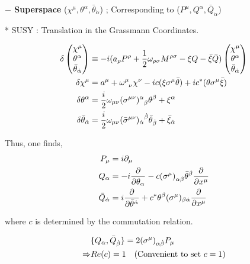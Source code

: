 \documentclass[11pt,letterpaper]{article}
\begin{document}
{\bfseries $-$ Superspace} ($\chi^\mu, \theta^\alpha, \bar{\theta}_\Dot{\alpha} $) ; Corresponding to ($P^\mu, Q^\alpha, \bar{Q}_\Dot{\alpha}$)

* SUSY : Translation in the Grassmann Coordinates.

$$
\begin{aligned}
	\delta
	\begin{pmatrix}
		\chi^\mu \\ \theta^\alpha \\ \bar{\theta}_\Dot{\alpha}
	\end{pmatrix}
	&\equiv -i(a_\rho P^\rho + \frac{1}{2}\omega_{\rho\sigma}M^{\rho\sigma}-\xi Q - \bar{\xi}\bar{Q})
	\begin{pmatrix}
		\chi^\mu \\ \theta^\alpha \\ \bar{\theta}_\Dot{\alpha}
	\end{pmatrix} \\
	\delta \chi^\mu &= a^\mu + \tensor{\omega}{^\mu_\nu}\chi^\nu - ic(\xi\sigma^\mu\bar{\theta}) + ic^*(\theta\sigma^\mu\bar{\xi}) \\
	\delta\theta^\alpha &= \frac{i}{2}\omega_{\mu\nu}\tensor{(\sigma^{\mu\nu})}{^\alpha_\beta}\theta^\beta + \xi^\alpha \\
	\delta\bar{\theta}_\Dot{\alpha} &= \frac{i}{2}\omega_{\mu\nu} {(\bar{\sigma}^{\mu\nu})_\Dot{\alpha}}^\Dot{\beta}\bar{\theta}_\Dot{\beta} + \bar{\xi}_\Dot{\alpha}
\end{aligned}
$$

\vs

Thus, one finds,
$$
\begin{aligned}
	P_\mu &= i\partial_\mu \\
	Q_\alpha &= -i\dfrac{\partial }{\partial \theta_\alpha} - c(\sigma^\mu)_{\alpha{\dot{\beta}}} \bar{\theta}^{\dot{\beta}} \dfrac{\partial }{\partial x^\mu} \\
	\bar{Q}_{\dot{\alpha}} &= i\dfrac{\partial }{\partial \bar{\theta}^{\dot{\alpha}}} + c^* \theta^\beta (\sigma^\mu)_{\beta{\dot{\alpha}}} \dfrac{\partial }{\partial x^\mu}
\end{aligned}
$$

\begin{center}
	where $c$ is determined by the commutation relation.
\end{center}
$$
\begin{aligned}
	&\{ Q_\alpha , \bar{Q}_{\dot{\beta}} \} = 2(\sigma^\mu)_{\alpha{\dot{\beta}}} P_\mu \\
	\Rightarrow & Re(c) = 1 \quad \text{(Convenient to set $c=1$)}
\end{aligned}
$$
\end{document}
